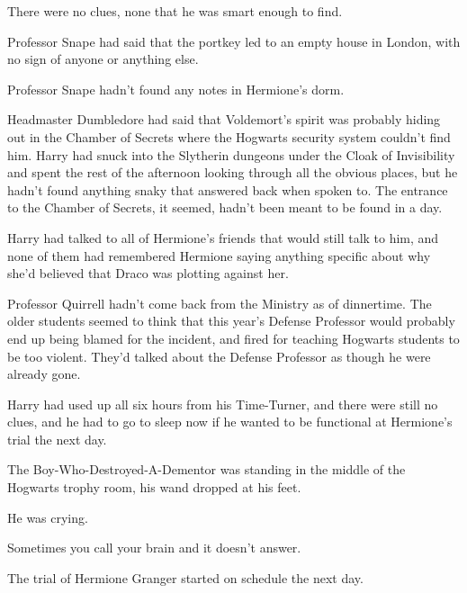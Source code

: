 There were no clues, none that he was smart enough to find.

Professor Snape had said that the portkey led to an empty house in London, with no sign of anyone or anything else.

Professor Snape hadn't found any notes in Hermione's dorm.

Headmaster Dumbledore had said that Voldemort's spirit was probably hiding out in the Chamber of Secrets where the Hogwarts security system couldn't find him. Harry had snuck into the Slytherin dungeons under the Cloak of Invisibility and spent the rest of the afternoon looking through all the obvious places, but he hadn't found anything snaky that answered back when spoken to. The entrance to the Chamber of Secrets, it seemed, hadn't been meant to be found in a day.

Harry had talked to all of Hermione's friends that would still talk to him, and none of them had remembered Hermione saying anything specific about why she'd believed that Draco was plotting against her.

Professor Quirrell hadn't come back from the Ministry as of dinnertime. The older students seemed to think that this year's Defense Professor would probably end up being blamed for the incident, and fired for teaching Hogwarts students to be too violent. They'd talked about the Defense Professor as though he were already gone.

Harry had used up all six hours from his Time-Turner, and there were still no clues, and he had to go to sleep now if he wanted to be functional at Hermione's trial the next day.

The Boy-Who-Destroyed-A-Dementor was standing in the middle of the Hogwarts trophy room, his wand dropped at his feet.

He was crying.

Sometimes you call your brain and it doesn't answer.

The trial of Hermione Granger started on schedule the next day.
